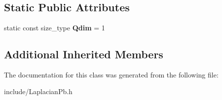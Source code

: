 \subsection*{Static Public Attributes}
\begin{DoxyCompactItemize}
\item 
\mbox{\label{classLaplacianPb_abcc44611e8914f470d51b1a15888cf29}} 
static const size\+\_\+type {\bfseries Qdim} = 1
\end{DoxyCompactItemize}
\subsection*{Additional Inherited Members}


The documentation for this class was generated from the following file\+:\begin{DoxyCompactItemize}
\item 
include/Laplacian\+Pb.\+h\end{DoxyCompactItemize}
